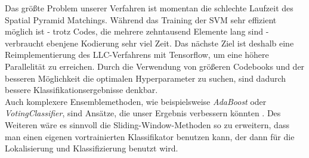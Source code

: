 Das größte Problem unserer Verfahren ist momentan die schlechte Laufzeit des Spatial Pyramid Matchings. Während das Training der SVM sehr effizient möglich ist - trotz Codes, die mehrere zehntausend Elemente lang sind - verbraucht ebenjene Kodierung sehr viel Zeit. Das nächste Ziel ist deshalb eine Reimplementierung des LLC-Verfahrens mit Tensorflow, um eine höhere Parallelität zu erreichen. Durch die Verwendung von größeren Codebooks und der besseren Möglichkeit die optimalen Hyperparameter zu suchen, sind dadurch bessere Klassifikationsergebnisse denkbar. \\
Auch komplexere Ensemblemethoden, wie beispielsweise \emph{AdaBoost} oder \emph{VotingClassifier}, sind Ansätze, die unser Ergebnis verbessern könnten \cite{ywkjwh13}. Des Weiteren wäre es sinnvoll die Sliding-Window-Methoden so zu erweitern, dass man einen eigenen vortrainierten Klassifikator benutzen kann, der dann für die Lokalisierung und Klassifizierung benutzt wird.